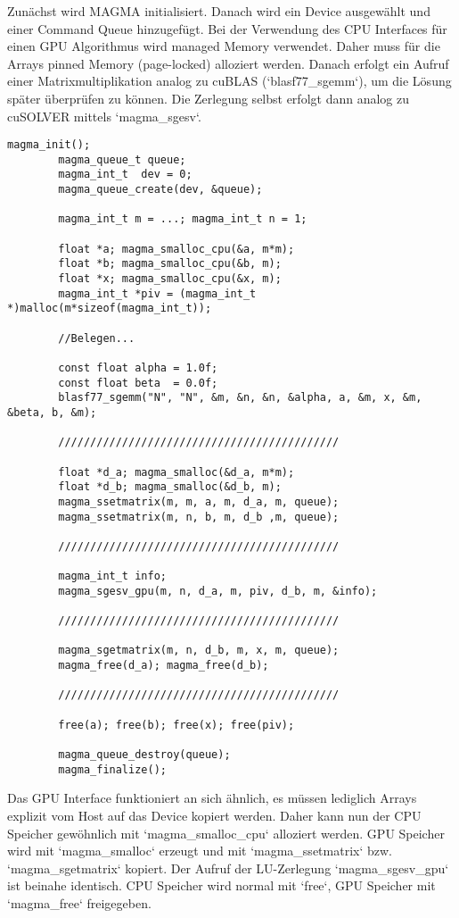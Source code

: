 		Zunächst wird MAGMA initialisiert. Danach wird ein Device ausgewählt und einer Command Queue hinzugefügt. Bei der Verwendung des CPU Interfaces für einen GPU Algorithmus wird managed Memory verwendet. Daher muss für die Arrays pinned Memory (page-locked) alloziert werden. Danach erfolgt ein Aufruf einer Matrixmultiplikation analog zu cuBLAS \mbox{(\li`blasf77_sgemm`)}, um die Lösung später überprüfen zu können. Die Zerlegung selbst erfolgt dann analog zu cuSOLVER mittels \li`magma_sgesv`.	
		
		\begin{lstlisting}[caption=MAGMA: GPU-Interface]
		magma_init();
		magma_queue_t queue;
		magma_int_t  dev = 0;
		magma_queue_create(dev, &queue);
  
		magma_int_t m = ...; magma_int_t n = 1;
                      
		float *a; magma_smalloc_cpu(&a, m*m);   
		float *b; magma_smalloc_cpu(&b, m);  
		float *x; magma_smalloc_cpu(&x, m);   
		magma_int_t *piv = (magma_int_t *)malloc(m*sizeof(magma_int_t));
		
		//Belegen...

		const float alpha = 1.0f;
		const float beta  = 0.0f;
		blasf77_sgemm("N", "N", &m, &n, &n, &alpha, a, &m, x, &m, &beta, b, &m);

		////////////////////////////////////////////
		
		float *d_a; magma_smalloc(&d_a, m*m);
		float *d_b; magma_smalloc(&d_b, m);		
		magma_ssetmatrix(m, m, a, m, d_a, m, queue);
		magma_ssetmatrix(m, n, b, m, d_b ,m, queue);
		
		////////////////////////////////////////////

		magma_int_t info;
		magma_sgesv_gpu(m, n, d_a, m, piv, d_b, m, &info);
		
		////////////////////////////////////////////
		
		magma_sgetmatrix(m, n, d_b, m, x, m, queue);
		magma_free(d_a); magma_free(d_b);
		
		////////////////////////////////////////////
		
		free(a); free(b); free(x); free(piv);
		
		magma_queue_destroy(queue);
		magma_finalize();
		\end{lstlisting}
		
		Das GPU Interface funktioniert an sich ähnlich, es müssen lediglich Arrays explizit vom Host auf das Device kopiert werden. Daher kann nun der CPU Speicher gewöhnlich mit \li`magma_smalloc_cpu` $\!\!$alloziert werden. GPU Speicher wird mit \li`magma_smalloc` erzeugt und mit \li`magma_ssetmatrix` bzw. \li`magma_sgetmatrix` kopiert. Der Aufruf der LU-Zerlegung \li`magma_sgesv_gpu` ist beinahe identisch. CPU Speicher wird normal mit \li`free`, GPU Speicher mit \li`magma_free` freigegeben.	
		

